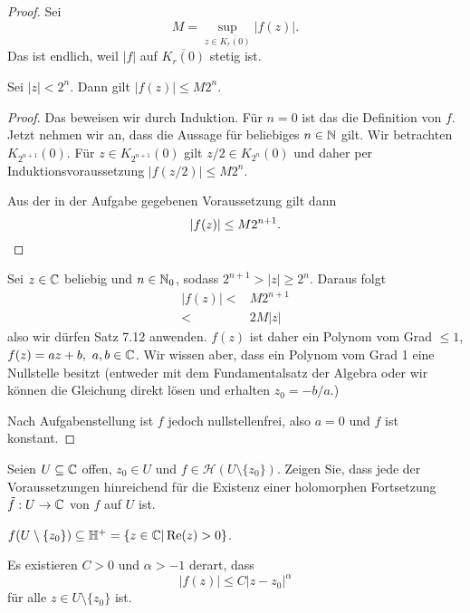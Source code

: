\begin{proof}
	Sei
	\[
	M=\sup_{z\in \overline{K_r(0)}}|f(z)|
	.\] 
	Das ist endlich, weil $|f|$ auf $\overline{K_r(0)}$ stetig ist.
	\begin{Theorem}
		Sei $|z|<2^n$. Dann gilt $|f(z)|\le M 2^n$. 
	\end{Theorem}
	\begin{proof}
		Das beweisen wir durch Induktion. Für $n=0$ ist das die Definition von $f$. Jetzt nehmen wir an, dass die Aussage für beliebiges $n\in \mathbb{N}$ gilt. Wir betrachten $K_{2^{n+1}}(0)$. Für $z\in K_{2^{n+1}}(0)$ gilt $z / 2\in K_{2^n}(0)$ und daher per Induktionsvoraussetzung $|f(z / 2)|\le M 2^n$.
		
		Aus der in der Aufgabe gegebenen Voraussetzung gilt dann
		\[
		|f(z)| \le M 2^{n+1}
		.\qedhere\] 
	\end{proof}
	Sei $z\in \mathbb{C}$ beliebig und $n\in \mathbb{N}_0$, sodass $2^{n+1}>|z|\ge 2^n$. Daraus folgt
	\begin{align*}
		|f(z)|<& M 2^{n+1}\\
		<& 2M|z|
	\end{align*}
	also wir dürfen Satz 7.12 anwenden. $f(z)$ ist daher ein Polynom vom Grad $\le 1$, $f(z)=az+b,~a,b\in \mathbb{C}$. Wir wissen aber, dass ein Polynom vom Grad 1 eine Nullstelle besitzt (entweder mit dem Fundamentalsatz der Algebra oder wir können die Gleichung direkt lösen und erhalten $z_0= - b / a$.)
	
	Nach Aufgabenstellung ist $f$ jedoch nullstellenfrei, also $a=0$ und $f$ ist konstant.
\end{proof}
\begin{Problem}
	Seien $U\subseteq \mathbb{C}$ offen, $z_0\in U$ und $f\in \mathcal{H}(U\setminus \{z_0\} )$. Zeigen Sie, dass jede der Voraussetzungen hinreichend für die Existenz einer holomorphen Fortsetzung $\tilde{f}:U\to \mathbb{C}$ von $f$ auf $U$ ist.
	\begin{parts}
		\item $f(U\setminus \{z_0\} )\subseteq \mathbb{H}^+=\{z\in \mathbb{C}|\Re(z)>0\} $.
		\item Es existieren $C>0$ und $\alpha>-1$ derart, dass
		\[
		|f(z)|\le C|z-z_0|^\alpha
		\]
		für alle $z\in U\setminus \{z_0\} $ ist.
	\end{parts}
\end{Problem}